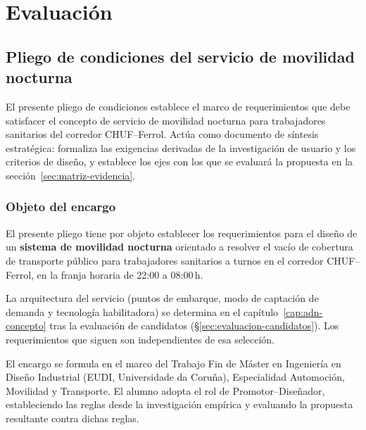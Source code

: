 \section{Evaluación}\label{sec:evaluacion}\label{cap:replicabilidad}


\subsection{Pliego de condiciones del servicio de movilidad nocturna}
\label{sec:pliego}

El presente pliego de condiciones establece el marco de requerimientos
que debe satisfacer el concepto de servicio de movilidad nocturna para
trabajadores sanitarios del corredor \acs{CHUF}--Ferrol. Actúa como
documento de síntesis estratégica: formaliza las exigencias derivadas
de la investigación de usuario y los criterios de diseño, y establece
los ejes con los que se evaluará la propuesta en la sección~\ref{sec:matriz-evidencia}.


\subsubsection{Objeto del encargo}
\label{sec:pliego-objeto}

El presente pliego tiene por objeto establecer los requerimientos para
el diseño de un \textbf{sistema de movilidad nocturna} orientado a
resolver el vacío de cobertura de transporte público para trabajadores
sanitarios a turnos en el corredor \acs{CHUF}--Ferrol, en la franja
horaria de 22:00 a 08:00\,h.

La arquitectura del servicio (puntos de embarque, modo de captación
de demanda y tecnología habilitadora) se determina en el
capítulo~\ref{cap:adn-concepto} tras la evaluación de candidatos
(§\ref{sec:evaluacion-candidatos}). Los requerimientos que siguen son
independientes de esa selección.

El encargo se formula en el marco del Trabajo Fin de Máster en
Ingeniería en Diseño Industrial (EUDI, Universidade da Coruña),
Especialidad Automoción, Movilidad y Transporte. El alumno adopta
el rol de Promotor--Diseñador, estableciendo las reglas desde la
investigación empírica y evaluando la propuesta resultante contra
dichas reglas.

